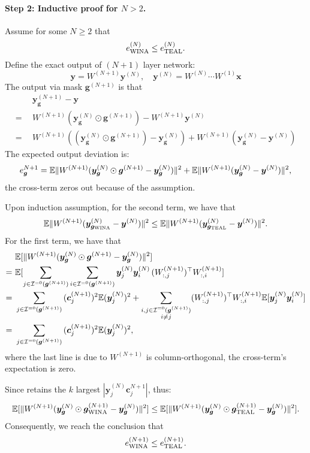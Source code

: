 \paragraph{Step 2: Inductive proof for $N>2$.}
Assume for some $N\ge2$ that
$$
e_{\text{\algacro{}}}^{(N)}\leq e_{\text{TEAL}}^{(N)}.
$$
Define the exact output of $(N+1)$ layer network:
$$
\bm{y} = W^{(N+1)} \bm{y}^{(N)}, \quad \bm{y}^{(N)} = W^{(N)}\cdots W^{(1)}\bm{x}
$$
The output via mask $\bm{g}^{(N+1)}$ is that
\begin{align*}
	&\ \bm{y}_{\bm{g}}^{(N+1)} - \bm{y} \\
	=\ &\ W^{(N+1)}(\bm{y}_{\bm{g}}^{(N)} \odot \bm{g}^{(N+1)}) - W^{(N+1)}\bm{y}^{(N)} \\
	=\ &\ W^{(N+1)}((\bm{y}_{\bm{g}}^{(N)} \odot \bm{g}^{(N+1)} ) - \bm{y}_{\bm{g}}^{(N)}) + W^{(N+1)}(\bm{y}_{\bm{g}}^{(N)} - \bm{y}^{(N)})
\end{align*}
The expected output deviation is:
\begin{equation}
	e_{\bm{g}}^{N+1}=\E\|W^{(N+1)}(\bm{y}_{\bm{g}}^{(N)} \odot \bm{g}^{(N+1)} - \bm{y}_{\bm{g}}^{(N)})\|^2 + \E\|W^{(N+1)}(\bm{y}_{\bm{g}}^{(N)} - \bm{y}^{(N)})\|^2,
\end{equation}
the cross-term zeros out because of the assumption. 

Upon induction assumption, for the second term, we have that 
\begin{equation}
	\E\|W^{(N+1)}(\bm{y}_{\bm{g}_\text{\algacro{}}}^{(N)} - \bm{y}^{(N)})\|^2\leq \E\|W^{(N+1)}(\bm{y}_{\bm{g}_\text{TEAL}}^{(N)} - \bm{y}^{(N)})\|^2.
\end{equation}
For the first term, we have that 
\begin{align*}
	&\ \mathbb{E}[\|W^{(N+1)}(\bm{y}_{\bm{g}}^{(N)} \odot \bm{g}^{(N+1)} - \bm{y}_{\bm{g}}^{(N)})\|^2]\\
	=&\ \E[{\sum_{j\in \mathcal{I}^{=0}(\bm{g}^{(N+1)})}\sum_{i\in \mathcal{I}^{=0}(\bm{g}^{(N+1)})} \bm{y}_j^{(N)}\bm{y}_i^{(N)}\,(W_{:,j}^{(N+1)})^\top W_{:,i}^{(N+1)}}]\\
	= &\ \sum_{j\in \mathcal{I}^{=0}(\bm{g}^{(N+1)})}{(\bm{c}_j^{(N+1)})^2\E{(\bm{y}_{j}^{(N)})^2}} + \sum_{\substack{i,j\in \mathcal{I}^{=0}(\bm{g}^{(N+1)})\\i\neq j}}({W_{:,j}^{(N+1)})^\top W_{:,i}^{(N+1)}\E[{\bm{y}_j^{(N)}\bm{y}_i^{(N)}}]}\\
	= &\ \sum_{j\in \mathcal{I}^{=0}(\bm{g}^{(N+1)})}{(\bm{c}_j^{(N+1)})^2\E{(\bm{y}_{j}^{(N)})^2}},
\end{align*}
where the last line is due to $W^{(N+1)}$ is column-orthogonal, the cross-term's expectation is zero.

Since \algacro{} retains the $k$ largest $|\bm{y}_j^{(N)}\bm{c}_j^{N+1}|$, thus:
\begin{equation}
	\mathbb{E}[\|W^{(N+1)}(\bm{y}_{\bm{g}}^{(N)} \odot \bm{g}_\text{\algacro{}}^{(N+1)} - \bm{y}_{\bm{g}}^{(N)})\|^2]\leq \mathbb{E}[\|W^{(N+1)}(\bm{y}_{\bm{g}}^{(N)} \odot \bm{g}_\text{TEAL}^{(N+1)} - \bm{y}_{\bm{g}}^{(N)})\|^2].
\end{equation}
Consequently, we reach the conclusion that
\begin{align}
	e_\text{\algacro{}}^{(N+1)}\leq e_\text{TEAL}^{(N+1)}.
\end{align}


